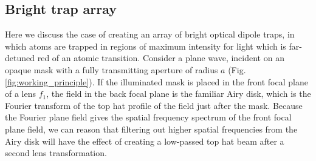 \subsection{Bright trap array}
Here we discuss the case of creating an array of bright optical dipole traps, in which atoms are trapped in regions of maximum intensity for light which is far-detuned red of an atomic transition. Consider a plane wave, incident on an opaque mask with a fully transmitting aperture of radius $a$ (Fig. \ref{fig:working_principle}). If the illuminated mask is placed in the front focal plane of a lens $f_1$, the field in the back focal plane is the familiar Airy disk, which is the Fourier transform of the top hat profile of the field just after the mask. Because the Fourier plane field gives the spatial frequency spectrum of the front focal plane field, we can reason that filtering out higher spatial frequencies from the Airy disk will have the effect of creating a low-passed top hat beam after a second lens transformation.  
